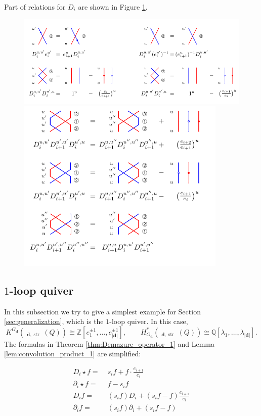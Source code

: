 \documentclass[reqno,11pt]{book}
\numberwithin{equation}{section}
\theoremstyle{plain}
\theoremstyle{plain}
\numberwithin{equation}{section}
\theoremstyle{remark}
\DeclareMathOperator{\RRep}{\widetilde{\operatorname{Rep}}}
\DeclareMathOperator{\str}{\operatorname{str}}
\newcommand{\dimvec}[1]{\mathbf{#1}}
\newcommand{\abdimvec}[1]{|\dimvec{#1}|}
\begin{document}
Part of relations for $D_i$ are shown in Figure \ref{fig:relations_2}.
\begin{figure}[ht]
  \vspace{0cm}
    \centering  
    \includegraphics[width=13cm]{figures/strands/relations_2.pdf} 
    \includegraphics[width=10cm]{figures/strands/relations_3.pdf} 
    \caption{}
      \label{fig:relations_2}        
\end{figure}
\subsection{$1$-loop quiver}
In this subsection we try to give a simplest example for Section \ref{sec:generalization}, which is the $1$-loop quiver. In this case,
$$K^{G_{\dimvec{d}}} \left(\RRep_{\dimvec{d},\str}(Q)\right) \cong  \mathbb{Z}\!\left[ e_1^{\pm 1},\ldots,e_{\abdimvec{d}}^{\pm 1} \right], \qquad H_{G_{\dimvec{d}}}^{*}\!\!\left(\RRep_{\dimvec{d},\str}(Q)\right) \cong  \mathbb{Q}\left[\lambda_1,\ldots,\lambda_{\abdimvec{d}}\right].$$
The formulas in Theorem \ref{thm:Demazure_operator_1} and Lemma \ref{lem:convolution_product_1} are simplified:

\begin{equation*}
\begin{aligned}
  D_i \star f =\;& s_i f + f\cdot \frac{e_{i+1}}{e_{i}}\\ 
  \partial_i \star f =\;& f -s_i f\\
  D_i f =\;& (s_i f) D_i + (s_i f-f) \frac{e_{i+1}}{e_i}\\ 
  \partial_i f =\;& (s_i f) \partial_i + (s_i f-f)\\   
\end{aligned}
\end{equation*}
\end{document}
